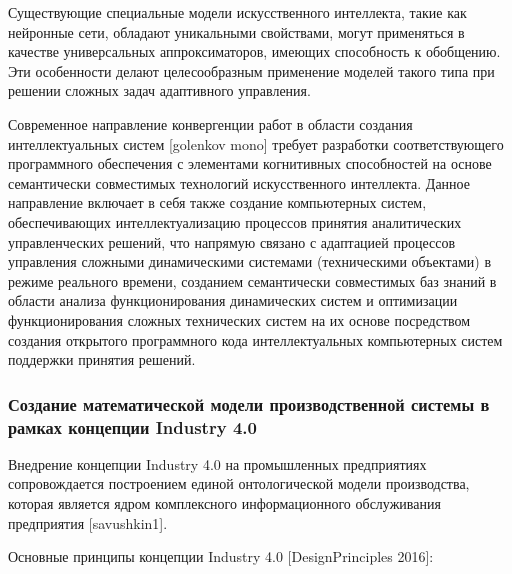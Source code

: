Существующие специальные модели искусственного интеллекта, такие как нейронные сети, обладают уникальными свойствами, могут применяться в качестве универсальных аппроксиматоров, имеющих способность к обобщению. Эти особенности делают целесообразным применение моделей такого типа при решении сложных задач адаптивного управления.

Современное направление конвергенции работ в области создания интеллектуальных систем [golenkov mono] требует разработки соответствующего программного обеспечения с элементами когнитивных способностей на основе семантически совместимых технологий искусственного интеллекта. Данное направление включает в себя также создание компьютерных систем, обеспечивающих интеллектуализацию процессов принятия аналитических управленческих решений, что напрямую связано с адаптацией процессов управления сложными динамическими системами (техническими объектами) в режиме реального времени, созданием семантически совместимых баз знаний в области анализа функционирования динамических систем и оптимизации функционирования сложных технических систем на их основе посредством создания открытого программного кода интеллектуальных компьютерных систем поддержки принятия решений.



\subsubsection{Создание математической модели производственной системы в рамках концепции Industry 4.0}

Внедрение концепции Industry 4.0 на промышленных предприятиях сопровождается построением единой онтологической модели производства, которая является ядром комплексного информационного обслуживания предприятия [savushkin1].

Основные принципы концепции Industry 4.0 [DesignPrinciples 2016]:

